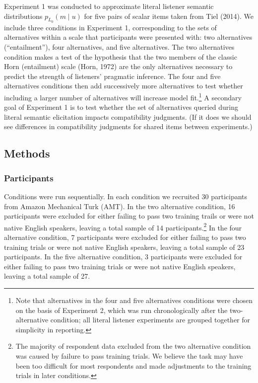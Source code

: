 \documentclass[10pt, letterpaper]{article}
\begin{document}
Experiment 1 was conducted to approximate literal listener semantic
distributions \(p_{L_0}(m \mid u)\) for five pairs of scalar items taken
from Tiel (2014). We include three conditions in Experiment 1,
corresponding to the sets of alternatives within a scale that
participants were presented with: two alternatives (``entailment''),
four alternatives, and five alternatives. The two alternatives condition
makes a test of the hypothesis that the two members of the classic Horn
(entailment) scale (Horn, 1972) are the only alternatives necessary to
predict the strength of listeners' pragmatic inference. The four and
five alternatives conditions then add successively more alternatives to
test whether including a larger number of alternatives will increase
model
fit.\footnote{Note that alternatives in the four and five alternatives conditions were chosen on the basis of Experiment 2, which was run chronologically after the two-alternative condition; all literal listener experiments are grouped together for simplicity in reporting.}
A secondary goal of Experiment 1 is to test whether the set of
alternatives queried during literal semantic elicitation impacts
compatibility judgments. (If it does we should see differences in
compatibility judgments for shared items between experiments.)

\subsection{Methods}\label{methods}

\subsubsection{Participants}\label{participants}

Conditions were run sequentially. In each condition we recruited 30
participants from Amazon Mechanical Turk (AMT). In the two alternative
condition, 16 participants were excluded for either failing to pass two
training trails or were not native English speakers, leaving a total
sample of 14
participants.\footnote{The majority of respondent data excluded from the two alternative condition was caused by failure to pass training trials. We believe the task may have been too difficult for most respondents and made adjustments to the training trials in later conditions.}
In the four alternative condition, 7 participants were excluded for
either failing to pass two training trials or were not native English
speakers, leaving a total sample of 23 participants. In the five
alternative condition, 3 participants were excluded for either failing
to pass two training trials or were not native English speakers, leaving
a total sample of 27.
\end{document}

